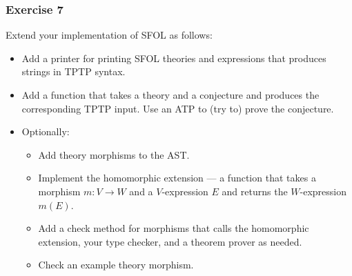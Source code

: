 \begin{frame}\frametitle{Exercise 7}
Extend your implementation of SFOL as follows:
\begin{itemize}
\item Add a printer for printing SFOL theories and expressions that produces strings in TPTP syntax.
\item Add a function that takes a theory and a conjecture and produces the corresponding TPTP input. Use an ATP to (try to) prove the conjecture.
\item Optionally:
\begin{itemize}
 \item Add theory morphisms to the AST.
 \item Implement the homomorphic extension --- a function that takes a morphism $m:V\to W$ and a $V$-expression $E$ and returns the $W$-expression $m(E)$.
 \item Add a check method for morphisms that calls the homomorphic extension, your type checker, and a theorem prover as needed.
 \item Check an example theory morphism.
\end{itemize}
\end{itemize}
\end{frame}
